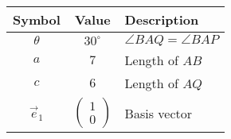     \begin{tabular}{|c|c|p{6cm}|}
        \hline
        \textbf{Symbol} & \textbf{Value} & \textbf{Description} \\
        \hline
        $\theta$ & $30^\circ$ & $\angle BAQ = \angle BAP$ \\
        \hline
        $a$ & $7$ & Length of $AB$ \\
        \hline
        $c$ & $6$ & Length of $AQ$ \\
        \hline
        $\vec{e}_1$ & $\begin{pmatrix} 1 \\ 0 \end{pmatrix}$ & Basis vector \\
        \hline
    \end{tabular}
